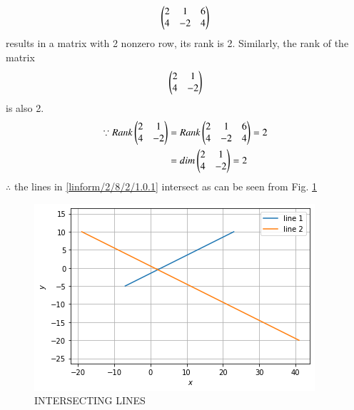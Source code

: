 %
\begin{align}
\begin{pmatrix}2 & 1 & 6\\4 & -2 & 4\end{pmatrix}
\end{align}
%
results in a matrix with 2 nonzero row, its rank is 2. 
%
Similarly, the rank of the matrix 
\begin{align}
\begin{pmatrix}2 & 1 \\4 & -2 \end{pmatrix} 
\end{align}
%
is also 2.
%
\begin{align}
\because Rank \begin{pmatrix}2 & 1\\4 & -2\end{pmatrix} &= Rank\begin{pmatrix}2 & 1 & 6\\4 & -2 & 4\end{pmatrix}=2\nonumber\\
&=dim\begin{pmatrix}2 & 1\\4 & -2\end{pmatrix}=2
\end{align}
$\therefore$ the  lines in \eqref{linform/2/8/2/1.0.1}  intersect as can be seen from Fig.     \ref{linform/2/8/2/fig: INTERSECTING LINES.}

\begin{figure}[ht!]
    \centering
    \includegraphics[width=\columnwidth]{solutions/su2021/2/8/2/intersecting lines.png}
    \caption{INTERSECTING LINES}
    \label{linform/2/8/2/fig: INTERSECTING LINES.}
\end{figure} 


